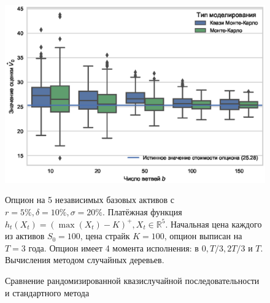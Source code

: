 \documentclass[specialist,
               substylefile = ../spbu.rtx,
               subf,href,colorlinks=true, 12pt]{disser}
\begin{document}
\begin{figure}[h]
    \centering
	\includegraphics[width=\textwidth]{quasi_vs_common_mc.eps}
	\caption{Сравнение рандомизированной квазислучайной последовательности и стандартного метода}
	\footnotesize Опцион на 5 независимых базовых активов с $r = 5\%, \delta = 10\%, \sigma = 20\%$. Платёжная функция $h_t(X_t) = \left(\max(X_t) - K\right)^+, X_t\in \mathbb R^5$. Начальная цена каждого из активов $S_0 = 100$, цена страйк $K = 100$, опцион выписан на $T=3$ года. Опцион имеет 4 момента исполнения: в $0, T/3, 2T/3$ и $T$. Вычисления методом случайных деревьев.
	\label{fig:quasi_vs_common_mc}
\end{figure}
\end{document}

